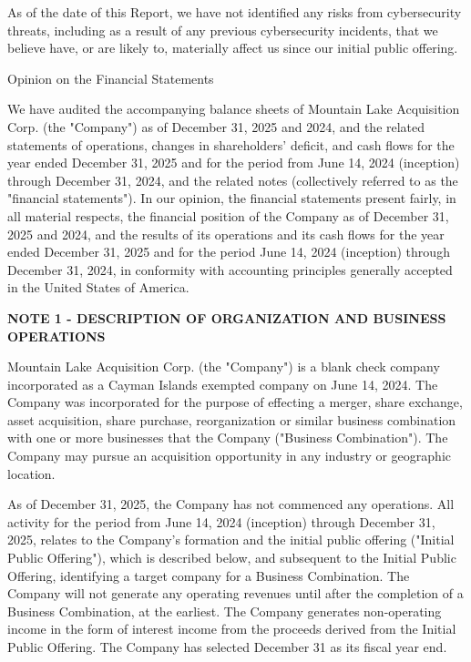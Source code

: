 \documentclass[11pt,a4paper]{article}
\begin{document}
As of the date of this Report, we have not identified any risks from cybersecurity threats, including as a result of any previous cybersecurity incidents, that we believe have, or are likely to, materially affect us since our initial public offering.

Opinion on the Financial Statements

We have audited the accompanying balance sheets of Mountain Lake Acquisition Corp. (the "Company") as of December 31, 2025 and 2024, and the related statements of operations, changes in shareholders' deficit, and cash flows for the year ended December 31, 2025 and for the period from June 14, 2024 (inception) through December 31, 2024, and the related notes (collectively referred to as the "financial statements"). In our opinion, the financial statements present fairly, in all material respects, the financial position of the Company as of December 31, 2025 and 2024, and the results of its operations and its cash flows for the year ended December 31, 2025 and for the period June 14, 2024 (inception) through December 31, 2024, in conformity with accounting principles generally accepted in the United States of America.

\textbf{NOTE 1 - DESCRIPTION OF ORGANIZATION AND BUSINESS OPERATIONS}

Mountain Lake Acquisition Corp. (the "Company") is a blank check company incorporated as a Cayman Islands exempted company on June 14, 2024. The Company was incorporated for the purpose of effecting a merger, share exchange, asset acquisition, share purchase, reorganization or similar business combination with one or more businesses that the Company ("Business Combination"). The Company may pursue an acquisition opportunity in any industry or geographic location.

As of December 31, 2025, the Company has not commenced any operations. All activity for the period from June 14, 2024 (inception) through December 31, 2025, relates to the Company's formation and the initial public offering ("Initial Public Offering"), which is described below, and subsequent to the Initial Public Offering, identifying a target company for a Business Combination. The Company will not generate any operating revenues until after the completion of a Business Combination, at the earliest. The Company generates non-operating income in the form of interest income from the proceeds derived from the Initial Public Offering. The Company has selected December 31 as its fiscal year end.
\end{document}
